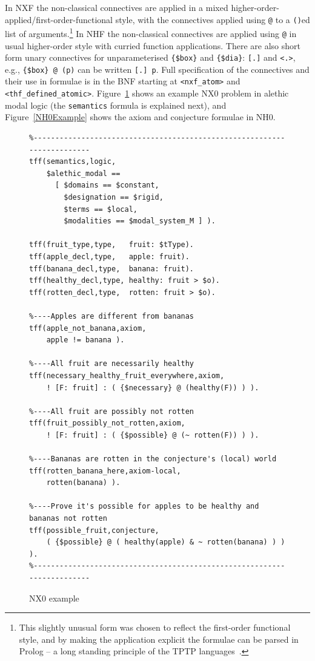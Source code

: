 \documentclass{ceurart}
\begin{document}
In NXF the non-classical connectives are applied in a mixed 
higher-order-applied/first-order-functional style, with the connectives applied using {\tt @}
to a {\tt ()}ed list of arguments.\footnote{%
This slightly unusual form was chosen to reflect the first-order functional style, and by making
the application explicit the formulae can be parsed in Prolog -- a long standing principle of the
TPTP languages~\cite{SZS04}.}
In NHF the non-classical connectives are applied using {\tt @} in usual higher-order style with 
curried function applications.
There are also short form unary connectives for unparameterised {\tt \{\$box\}} and 
{\tt \{\$dia\}}: {\tt [.]} and {\tt <.>}, e.g., {\tt \{\$box\}\,@\,(p)} can be written {\tt [.]\,p}.
Full specification of the connectives and their use in formulae is in the BNF
starting at {\tt <nxf\_atom>} and {\tt <thf\_defined\_atomic>}.
Figure~\ref{NX0Example} shows an example NX0 problem in alethic modal logic (the {\tt semantics} 
formula is explained next), and Figure~\ref{NH0Example} shows the axiom and conjecture formulae 
in NH0.

\begin{figure}[h!]
\small
{}
\begin{verbatim}
%------------------------------------------------------------------------
tff(semantics,logic,
    $alethic_modal == 
      [ $domains == $constant,
        $designation == $rigid,
        $terms == $local,
        $modalities == $modal_system_M ] ).

tff(fruit_type,type,   fruit: $tType).
tff(apple_decl,type,   apple: fruit).
tff(banana_decl,type,  banana: fruit).
tff(healthy_decl,type, healthy: fruit > $o).
tff(rotten_decl,type,  rotten: fruit > $o).

%----Apples are different from bananas
tff(apple_not_banana,axiom,
    apple != banana ).

%----All fruit are necessarily healthy
tff(necessary_healthy_fruit_everywhere,axiom,
    ! [F: fruit] : ( {$necessary} @ (healthy(F)) ) ).

%----All fruit are possibly not rotten
tff(fruit_possibly_not_rotten,axiom,
    ! [F: fruit] : ( {$possible} @ (~ rotten(F)) ) ).

%----Bananas are rotten in the conjecture's (local) world
tff(rotten_banana_here,axiom-local,
    rotten(banana) ).

%----Prove it's possible for apples to be healthy and bananas not rotten
tff(possible_fruit,conjecture,
    ( {$possible} @ ( healthy(apple) & ~ rotten(banana) ) ) ).
%------------------------------------------------------------------------
\end{verbatim}
\caption{NX0 example}
\label{NX0Example}
\end{figure}
\end{document}
